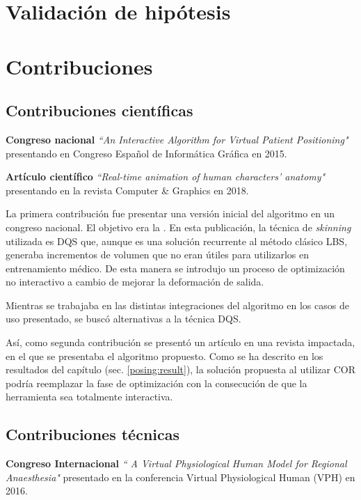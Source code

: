 \section{Validación de hipótesis}
\label{conclu:hipotesis}
\section{Contribuciones}
\subsection{Contribuciones científicas}
\label{conclu:cientifica}

\textbf{Congreso nacional } \emph{``An Interactive Algorithm for Virtual Patient Positioning"} \cite{asdf} presentando en Congreso Español de Informática Gráfica en 2015. 

\textbf{Artículo científico }\emph{``Real-time animation of human characters' anatomy"}\cite{asdf} presentando en la revista Computer \& Graphics en 2018. 

La primera contribución fue presentar una versión inicial del algoritmo en un congreso nacional. El objetivo era la .
En esta publicación, la técnica de \emph{skinning} utilizada es \ac{DQS} que, aunque es una solución recurrente al método clásico \ac{LBS}, generaba incrementos de volumen que no eran útiles para utilizarlos en entrenamiento médico. De esta manera se introdujo un proceso de optimización no interactivo a cambio de mejorar la deformación de salida.

Mientras se trabajaba en las distintas integraciones del algoritmo en los casos de uso presentado, se buscó alternativas a la técnica \ac{DQS}.

Así, como segunda contribución se presentó un artículo en una revista impactada, en el que se presentaba el algoritmo propuesto. Como se ha descrito en los resultados del capítulo (sec. \ref{posing:result}), la solución propuesta al utilizar \ac{COR} podría reemplazar la fase de optimización con la consecución de que la herramienta sea totalmente interactiva.





\subsection{Contribuciones técnicas}
\label{conclu:tecnica}
\textbf{ Congreso Internacional }\emph{`` A Virtual Physiological Human Model for Regional Anaesthesia"}\cite{asdf} presentado en la conferencia Virtual Physiological Human (VPH) en 2016.

